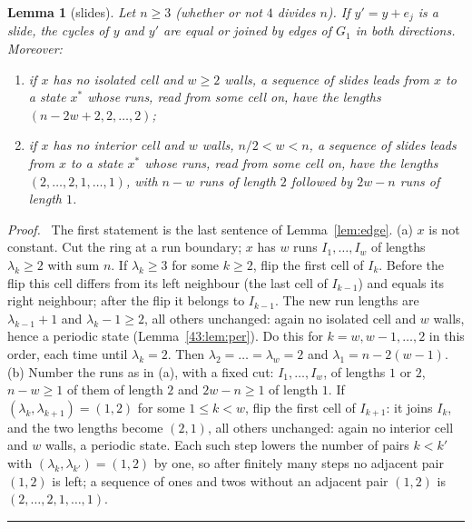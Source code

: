 \documentclass[10pt,a4paper]{article}
\newtheorem{lemma}[theorem]{Lemma}
\newcommand{\qedmark}{\rule{1.1ex}{1.1ex}}
\newenvironment{proof}[1][Proof]{\par\smallskip\noindent\textit{#1.}\ }{\hfill\qedmark\par\smallskip}
\newcommand{\Gone}{G_1}                       %
\begin{document}
\begin{lemma}[slides]\label{43:lem:slides}
Let $n\ge 3$ (whether or not $4$ divides $n$). If $y'=y+e_j$ is a slide, the cycles of $y$ and $y'$ are equal or joined by edges of $\Gone$ in
both directions. Moreover:
\begin{enumerate}[label=(\alph*),nosep,leftmargin=*]
\item if $x$ has no isolated cell and $w\ge 2$ walls, a sequence of slides leads from $x$ to a state $x^*$ whose
runs, read from some cell on, have the lengths $(n-2w+2,2,\dots,2)$;
\item if $x$ has no interior cell and $w$ walls, $n/2<w<n$, a sequence of slides leads from $x$ to a state $x^*$
whose runs, read from some cell on, have the lengths $(2,\dots,2,1,\dots,1)$, with $n-w$ runs of length $2$
followed by $2w-n$ runs of length $1$.
\end{enumerate}
\end{lemma}
\begin{proof}
The first statement is the last sentence of Lemma~\ref{lem:edge}.
(a) $x$ is not constant. Cut the ring at a run boundary; $x$ has $w$ runs $I_1,\dots,I_w$ of lengths
$\lambda_k\ge 2$ with sum $n$. If $\lambda_k\ge 3$ for some $k\ge 2$, flip the first cell of $I_k$. Before the
flip this cell differs from its left neighbour (the last cell of $I_{k-1}$) and equals its right neighbour;
after the flip it belongs to $I_{k-1}$. The new run lengths are $\lambda_{k-1}+1$ and $\lambda_k-1\ge 2$, all
others unchanged: again no isolated cell and $w$ walls, hence a periodic state (Lemma~\ref{43:lem:per}). Do this
for $k=w,w-1,\dots,2$ in this order, each time until $\lambda_k=2$. Then $\lambda_2=\dots=\lambda_w=2$ and
$\lambda_1=n-2(w-1)$.
(b) Number the runs as in (a), with a fixed cut: $I_1,\dots,I_w$, of lengths $1$ or $2$, $n-w\ge 1$ of them of
length $2$ and $2w-n\ge 1$ of length $1$. If $(\lambda_k,\lambda_{k+1})=(1,2)$ for some $1\le k<w$, flip the
first cell of $I_{k+1}$: it joins $I_k$, and the two lengths become $(2,1)$, all others unchanged: again no
interior cell and $w$ walls, a periodic state. Each such step lowers the number of pairs $k<k'$ with
$(\lambda_k,\lambda_{k'})=(1,2)$ by one, so after finitely many steps no adjacent pair $(1,2)$ is left; a
sequence of ones and twos without an adjacent pair $(1,2)$ is $(2,\dots,2,1,\dots,1)$.
\end{proof}
\end{document}
